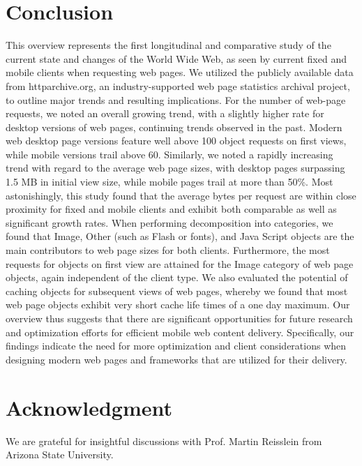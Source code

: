 \documentclass[journal,final]{IEEEtran}
\begin{document}
\section{Conclusion}
\label{s:conc}
This overview represents the first longitudinal and comparative study of the current state and changes of the World Wide Web, as seen by current fixed and mobile clients when requesting web pages.
We utilized the publicly available data from httparchive.org, an industry-supported web page statistics archival project, to outline major trends and resulting implications.
For the number of web-page requests, we noted an overall growing trend, with a slightly higher rate for desktop versions of web pages, continuing trends observed in the past. 
Modern web desktop page versions feature well above 100 object requests on first views, while mobile versions trail above 60.
Similarly, we noted a rapidly increasing trend with regard to the average web page sizes, with desktop pages surpassing 1.5 MB in initial view size, while mobile pages trail at more than 50\%.
Most astonishingly, this study found that the average bytes per request are within close proximity for fixed and mobile clients and exhibit both comparable as well as significant growth rates.
When performing decomposition into categories, we found that Image, Other (such as Flash or fonts), and Java Script objects are the main contributors to web page sizes for both clients. Furthermore, the most requests for objects on first view are attained for the Image category of web page objects, again independent of the client type.
We also evaluated the potential of caching objects for subsequent views of web pages, whereby we found that most web page objects exhibit very short cache life times of a one day maximum.
Our overview thus suggests that there are significant opportunities for future research and optimization efforts for efficient mobile web content delivery. 
Specifically, our findings indicate the need for more optimization and client considerations when designing modern web pages and frameworks that are utilized for their delivery.


\section*{Acknowledgment}
We are grateful for insightful discussions with Prof. Martin Reisslein from Arizona State University.
\end{document}
